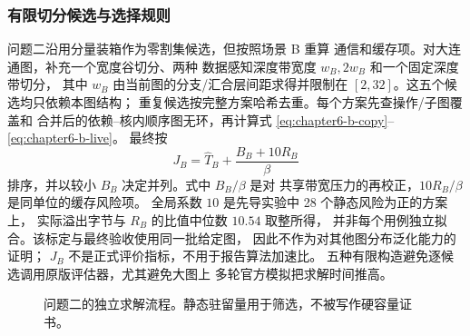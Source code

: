 \subsubsection{有限切分候选与选择规则}
问题二沿用分量装箱作为零割集候选，但按照场景 B 重算
通信和缓存项。对大连通图，补充一个宽度谷切分、两种
数据感知深度带宽度 $w_B,2w_B$ 和一个固定深度带切分，
其中 $w_B$ 由当前图的分支/汇合层间距求得并限制在
$[2,32]$。这五个候选均只依赖本图结构；
重复候选按完整方案哈希去重。每个方案先查操作/子图覆盖和
合并后的依赖--核内顺序图无环，再计算式
\eqref{eq:chapter6-b-copy}--\eqref{eq:chapter6-b-live}。
最终按
\begin{equation}
J_B=\widehat T_B+\frac{B_B+10R_B}{\beta}
\label{eq:chapter6-b-rank}
\end{equation}
排序，并以较小 $B_B$ 决定并列。式中 $B_B/\beta$ 是对
共享带宽压力的再校正，$10R_B/\beta$ 是同单位的缓存风险项。
全局系数 $10$ 是先导实验中 28 个静态风险为正的方案上，
实际溢出字节与 $R_B$ 的比值中位数 $10.54$ 取整所得，
并非每个用例独立拟合。该标定与最终验收使用同一批给定图，
因此不作为对其他图分布泛化能力的证明；
$J_B$ 不是正式评价指标，不用于报告算法加速比。
五种有限构造避免逐候选调用原版评估器，尤其避免大图上
多轮官方模拟把求解时间推高。

\begin{figure}[htbp]
\centering
{}
\caption{问题二的独立求解流程。静态驻留量用于筛选，不被写作硬容量证书。}
\label{fig:chapter6-alg-b}
\end{figure}

